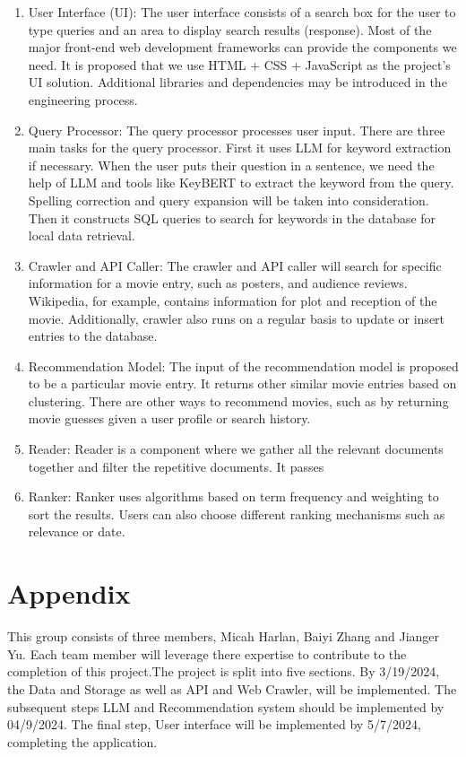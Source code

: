 \documentclass[journal]{IEEEtran}
\begin{document}
\begin{enumerate}
    \item  {User Interface (UI)}: The user interface consists of a search box for the user to type queries and an area to display search results (response). Most of the major front-end web development frameworks can provide the components we need. It is proposed that we use HTML + CSS + JavaScript as the project’s UI solution. Additional libraries and dependencies may be introduced in the engineering process.

    \item {Query Processor}: The query processor processes user input. There are three main tasks for the query processor. First it uses LLM for keyword extraction if necessary. When the user puts their question in a sentence, we need the help of LLM and tools like KeyBERT to extract the keyword from the query. Spelling correction and query expansion will be taken into consideration. Then it constructs SQL queries to search for keywords in the database for local data retrieval.

    \item {Crawler and API Caller}: The crawler and API caller will search for specific information for a movie entry, such as posters, and audience reviews. Wikipedia, for example, contains information for plot and reception of the movie. Additionally, crawler also runs on a regular basis to update or insert entries to the database.

    \item {Recommendation Model}: The input of the recommendation model is proposed to be a particular movie entry. It returns other similar movie entries based on clustering. There are other ways to recommend movies, such as by returning movie guesses given a user profile or search history.

    \item {Reader}: Reader is a component where we gather all the relevant documents together and filter the repetitive documents. It passes 

    \item {Ranker}: Ranker uses algorithms based on term frequency and weighting to sort the results. Users can also choose different ranking mechanisms such as relevance or date.
\end{enumerate}

\section{Appendix}
This group consists of three members, Micah Harlan, Baiyi Zhang and Jianger Yu. Each team member will leverage there expertise to contribute to the completion of this project.The project is split into five sections. By 3/19/2024, the Data and Storage as well as API and Web Crawler, will be implemented. The subsequent steps LLM and Recommendation system should be implemented by 04/9/2024. The final step, User interface will be implemented by 5/7/2024, completing the application.



\end{document}
